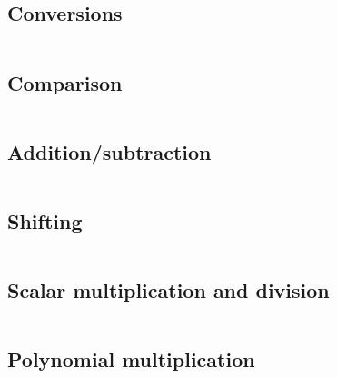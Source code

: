 \documentclass[a4paper,10pt]{article}
\begin{document}
\subsection{Conversions}

\begin{lstlisting}
\end{lstlisting}
\begin{quote}
\end{quote}


\subsection{Comparison}


\begin{lstlisting}
\end{lstlisting}
\begin{quote}
\end{quote}



\subsection{Addition/subtraction}


\begin{lstlisting}
\end{lstlisting}
\begin{quote}
\end{quote}


\subsection{Shifting}

\begin{lstlisting}
\end{lstlisting}
\begin{quote}
\end{quote}


\subsection{Scalar multiplication and division}

\begin{lstlisting}
\end{lstlisting}
\begin{quote}
\end{quote}

\subsection{Polynomial multiplication}
\end{document}
